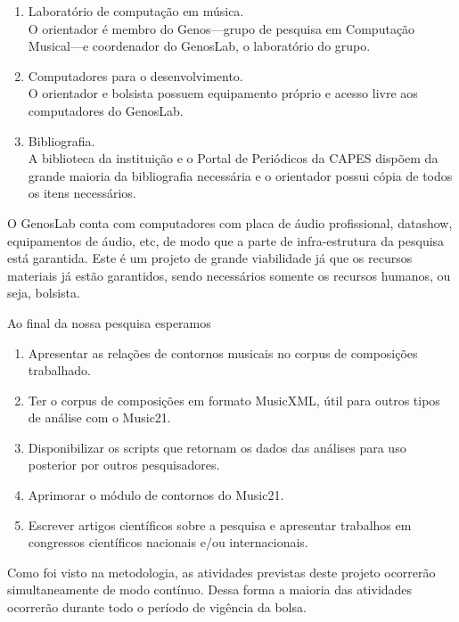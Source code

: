 \documentclass[11pt]{article}
\begin{document}
\begin{enumerate}
\item Laboratório de computação em música. \\
  O orientador é membro do Genos---grupo de pesquisa em Computação
  Musical---e coordenador do GenosLab, o laboratório do grupo.
\item Computadores para o desenvolvimento.\\
  O orientador e bolsista possuem equipamento próprio e acesso livre
  aos computadores do GenosLab.
\item Bibliografia.\\ A biblioteca da instituição e o Portal de
  Periódicos da CAPES dispõem da grande maioria da bibliografia
  necessária e o orientador possui cópia de todos os itens
  necessários.
\end{enumerate}

O GenosLab conta com computadores com placa de áudio profissional,
datashow, equipamentos de áudio, etc, de modo que a parte de
infra-estrutura da pesquisa está garantida. Este é um projeto de
grande viabilidade já que os recursos materiais já estão garantidos,
sendo necessários somente os recursos humanos, ou seja, bolsista.


Ao final da nossa pesquisa esperamos
\begin{enumerate}
\item Apresentar as relações de contornos musicais no corpus de
  composições trabalhado.
\item Ter o corpus de composições em formato MusicXML, útil para
  outros tipos de análise com o Music21.
\item Disponibilizar os scripts que retornam os dados das análises
  para uso posterior por outros pesquisadores.
\item Aprimorar o módulo de contornos do Music21.
\item Escrever artigos científicos sobre a pesquisa e apresentar
  trabalhos em congressos científicos nacionais e/ou internacionais.
\end{enumerate}


Como foi visto na metodologia, as atividades previstas deste projeto
ocorrerão simultaneamente de modo contínuo. Dessa forma a maioria das
atividades ocorrerão durante todo o período de vigência da bolsa.
\end{document}
